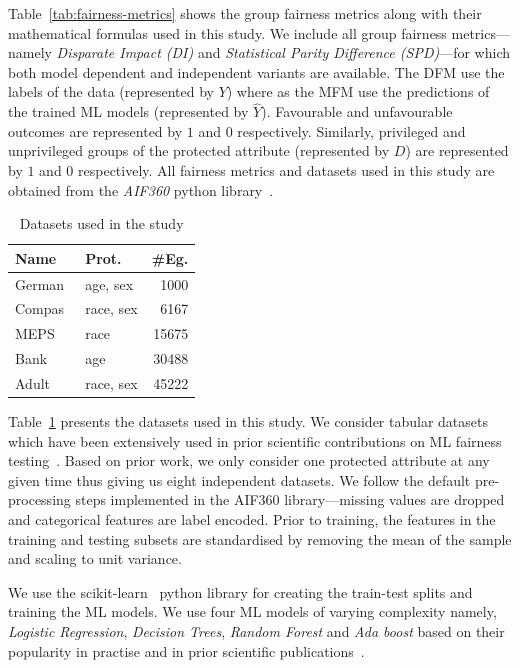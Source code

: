 \documentclass{article}
\begin{document}
Table \ref{tab:fairness-metrics} shows the group fairness metrics
along with their mathematical formulas used in this study. We include
all group fairness metrics---namely \emph{Disparate Impact (DI)} and
\emph{Statistical Parity Difference (SPD)}---for which both model
dependent and independent variants are available. The DFM use the
labels of the data (represented by $Y$) where as the MFM use the
predictions of the trained ML models (represented by
$\hat{Y}$). Favourable and unfavourable outcomes are represented by
$1$ and $0$ respectively. Similarly, privileged and unprivileged
groups of the protected attribute (represented by $D$) are represented
by $1$ and $0$ respectively. All fairness metrics and datasets used in
this study are obtained from the \emph{AIF360} python
library \cite{bellamy2019ai}.

\begin{table}
  \centering
  \begin{tabular}{l l r}
    \toprule
    \textbf{Name} & \textbf{Prot.} & \textbf{\#Eg.}\\
    \midrule
    German \cite{hofmann1994german} & age, sex & 1000\\
    Compas\cite{angwin2016machine} & race, sex & 6167\\
    MEPS \cite{mepsdata} & race & 15675\\
    Bank\cite{moro2014data} & age & 30488\\
    Adult\cite{kohavi1996scaling} & race, sex & 45222\\
    \bottomrule
  \end{tabular}
  \caption{Datasets used in the study}
  \label{tab:datasets}
\end{table}

Table \ref{tab:datasets} presents the datasets used in this study. We
consider tabular datasets which have been extensively used in prior
scientific contributions on ML fairness
testing \cite{zhang2021ignorance,biswas2020machine,biswas2021fair,chen2022fairness}. Based
on prior work, we only consider one protected attribute at any given
time thus giving us eight independent datasets. We follow the default
pre-processing steps implemented in the AIF360 library---missing
values are dropped and categorical features are label encoded. Prior
to training, the features in the training and testing subsets are
standardised by removing the mean of the sample and scaling to unit
variance.

We use the scikit-learn \cite{pedregosa2011scikit} python library for
creating the train-test splits and training the ML models. We use four
ML models of varying complexity namely, \emph{Logistic Regression},
\emph{Decision Trees}, \emph{Random Forest} and \emph{Ada boost} based
on their popularity in practise and in prior scientific
publications \cite{zhang2021ignorance,biswas2021fair,biswas2020machine}.
\end{document}
